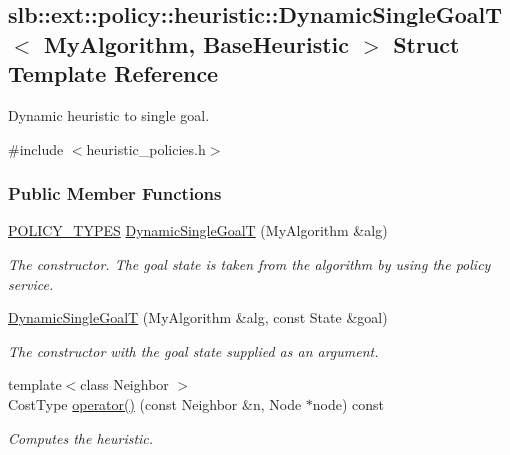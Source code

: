 \hypertarget{structslb_1_1ext_1_1policy_1_1heuristic_1_1DynamicSingleGoalT}{}\subsection{slb\+:\+:ext\+:\+:policy\+:\+:heuristic\+:\+:Dynamic\+Single\+GoalT$<$ My\+Algorithm, Base\+Heuristic $>$ Struct Template Reference}
\label{structslb_1_1ext_1_1policy_1_1heuristic_1_1DynamicSingleGoalT}


Dynamic heuristic to single goal.  




{\ttfamily \#include $<$heuristic\+\_\+policies.\+h$>$}

\subsubsection*{Public Member Functions}
\begin{DoxyCompactItemize}
\item 
\hyperlink{extensions_2shared__policies_2headers_8h_ae70a06fa4631780beea14971eb36a562}{P\+O\+L\+I\+C\+Y\+\_\+\+T\+Y\+P\+ES} \hyperlink{structslb_1_1ext_1_1policy_1_1heuristic_1_1DynamicSingleGoalT_ab491e6a9a177935e45f3c0b93389a286}{Dynamic\+Single\+GoalT} (My\+Algorithm \&alg)
\begin{DoxyCompactList}\small\item\em The constructor. The goal state is taken from the algorithm by using the policy service. \end{DoxyCompactList}\item 
\hyperlink{structslb_1_1ext_1_1policy_1_1heuristic_1_1DynamicSingleGoalT_a97461ead765eae5d7f184641a832c9b1}{Dynamic\+Single\+GoalT} (My\+Algorithm \&alg, const State \&goal)
\begin{DoxyCompactList}\small\item\em The constructor with the goal state supplied as an argument. \end{DoxyCompactList}\item 
{\footnotesize template$<$class Neighbor $>$ }\\Cost\+Type \hyperlink{structslb_1_1ext_1_1policy_1_1heuristic_1_1DynamicSingleGoalT_ab2839e7036a9450c47aa91316afbaee1}{operator()} (const Neighbor \&n, Node $\ast$node) const 
\begin{DoxyCompactList}\small\item\em Computes the heuristic. \end{DoxyCompactList}\end{DoxyCompactItemize}
